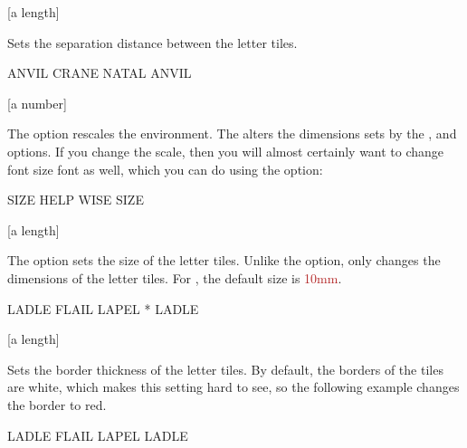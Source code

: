 \documentclass[svgnames]{report}
\begin{document}
  [a length]

  Sets the separation distance between the  letter
  tiles.

  \begin{example}
  \begin{wordle}[separation=2mm, borders=black]{ANVIL}
    CRANE
    NATAL
    ANVIL
  \end{wordle}
  \end{example}

  [a number]

  The  option rescales the  environment.
  The  alters the dimensions sets by the ,
    and   options.  If
  you change the scale, then you will almost certainly want
  to change font size font as well, which you can do using the
   option:

  \begin{example}
  \begin{wordle}[scale=1.5, font=\huge\bfseries]{SIZE}
     HELP
     WISE
     SIZE
  \end{wordle}
  \end{example}

  [a length]

  The  option sets the size of the  letter
  tiles. Unlike the  option,  only changes
  the dimensions of the letter tiles. For , the
  default size is \textcolor{FireBrick}{10mm}.

  \begin{example}
  \begin{wordle}[size=10mm, font=\huge\bfseries]{LADLE}
     FLAIL LAPEL * LADLE
  \end{wordle}
  \end{example}

  [a length]

  Sets the border thickness of the  letter tiles.  By
  default, the borders of the tiles are white, which makes this setting
  hard to see, so the following example changes the border to red.

  \begin{example}
  \begin{wordle}[thickness=1mm, borders=red]{LADLE}
     FLAIL
     LAPEL
     LADLE
  \end{wordle}
  \end{example}
\end{document}
